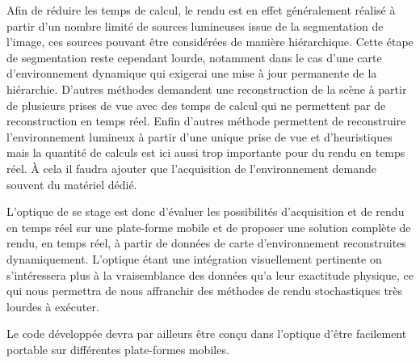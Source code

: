 \documentclass[10pt,a4paper,twoside, twocolumn]{report}
\newcommand*{\rootPath}{../}
\begin{document}
Afin de réduire les temps de calcul, le rendu est en effet généralement réalisé à partir d'un nombre limité de sources lumineuses issue de la segmentation de l'image\cite{Work2003}\cite{Havran2003}, ces sources pouvant être considérées de manière hiérarchique\cite{Gibson2003}. Cette étape de segmentation reste cependant lourde, notamment dans le cas d'une carte d'environnement dynamique qui exigerai une mise à jour permanente de la hiérarchie. D'autres méthodes demandent une reconstruction de la scène à partir de plusieurs prises de vue \cite{Laffont2012} avec des temps de calcul qui ne permettent par de reconstruction en temps réel. Enfin d'autres méthode permettent de reconstruire l'environnement lumineux à partir d'une unique prise de vue et d'heuristiques mais la quantité de calculs est ici aussi trop importante pour du rendu en temps réel\cite{Lopez-Moreno2010}. À cela il faudra ajouter que l’acquisition de l'environnement demande souvent du matériel dédié.

L'optique de se stage est donc d'évaluer les possibilités d'acquisition et de rendu en temps réel sur une plate-forme mobile et de proposer une solution complète de rendu, en temps réel, à partir de données de carte d'environnement reconstruites dynamiquement. L'optique étant une intégration visuellement pertinente on s’intéressera plus à la vraisemblance des données qu'a leur exactitude physique, ce qui nous permettra de nous affranchir des méthodes de rendu stochastiques très lourdes à exécuter.

Le code développée devra par ailleurs être conçu dans l'optique d'être facilement portable sur différentes plate-formes mobiles.


\ifstandalone
	
	
\fi
\end{document}
